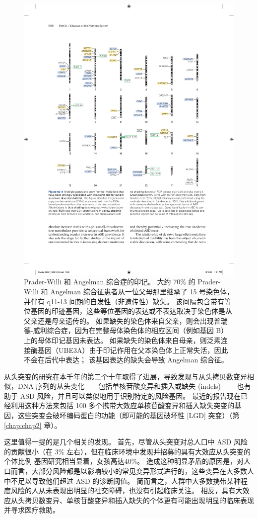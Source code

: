 \begin{figure}[htbp]
	\centering
	\includegraphics[width=0.9\linewidth]{chap62/fig_62_8}
	\caption{Prader-Willi 和 Angelman 综合症的印记。 大约 70\% 的 Prader-Willi 和 Angelman 综合征患者从一位父母那里继承了 15 号染色体，并伴有 q11-13 间期的自发性（非遗传性）缺失。 该间隔包含带有等位基因的印迹基因，这些等位基因的表达或不表达取决于染色体是从父亲还是母亲遗传的。 如果缺失的染色体来自父亲，则会出现普瑞德-威利综合症，因为在完整母体染色体的相应区间（例如基因 B）上的母体印记基因未表达。 如果缺失的染色体来自母亲，则泛素连接酶基因（UBE3A）由于印记作用在父本染色体上正常失活，因此不会在后代中表达； 该基因表达的缺失会导致 Angelman 综合征。}
	\label{fig:62_8}
\end{figure}


从头突变的研究在本千年的第二个十年取得了进展，导致发现与从头拷贝数变异相似，DNA 序列的从头变化——包括单核苷酸变异和插入或缺失 (indels)—— 也有助于 ASD 风险，并且可以类似地用于识别特定的风险基因。
最近的报告现在已经利用这种方法来包括 100 多个携带大效应单核苷酸变异和插入缺失突变的基因，这些突变会破坏编码蛋白的功能（即可能的基因破坏性 [LGD] 突变）（第 \ref{chap:chap2} 章）。


这里值得一提的是几个相关的发现。
首先，尽管从头突变对总人口中 ASD 风险的贡献很小（在 3\% 左右），但在临床环境中发现并招募的具有大效应从头突变的个体比例 基因研究相当显着，女孩高达40\%。 造成这种明显矛盾的原因是，对人口而言，大部分风险都是以影响较小的常见变异形式进行的，这些变异在大多数人中不足以导致他们超过 ASD 的诊断阈值。
简而言之，人群中大多数携带某种程度风险的人从未表现出明显的社交障碍，也没有引起临床关注。
相反，具有大效应从头拷贝数变异、单核苷酸变异和插入缺失的个体更有可能出现明显的临床表现并寻求医疗救助。


